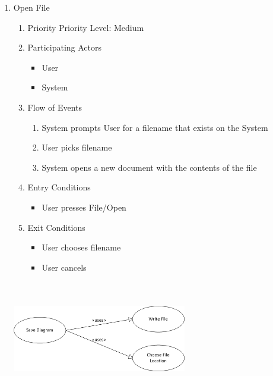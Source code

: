 \documentclass[a4paper, 12pt]{article}
\begin{document}
\begin{enumerate}
\item Open File
  \begin {enumerate}
  \item Priority Priority Level: Medium
  \item Participating Actors
    \begin {itemize}
    \item User
    \item System
    \end {itemize}
  \item Flow of Events
    \begin {enumerate}
    \item System prompts User for a filename that exists on the System
    \item User picks filename
    \item System opens a new document with the contents of the file
    \end {enumerate}
  \item  Entry Conditions 
    \begin {itemize}
    \item User presses File/Open
    \end {itemize}
  \item Exit Conditions
    \begin {itemize}
    \item User chooses filename
    \item User cancels
    \end {itemize}
  \end {enumerate}

  \begin {center}
    \includegraphics[height=2in,width=3in]{img/SaveDiagram.png}
  \end {center}


\end{enumerate}
\end{document}
